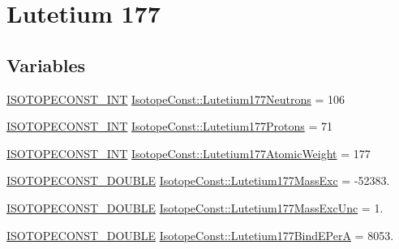 \hypertarget{group___isotope_const-_lutetium-_lu177}{}\section{Lutetium 177}
\label{group___isotope_const-_lutetium-_lu177}
\subsection*{Variables}
\begin{DoxyCompactItemize}
\item 
\mbox{\hyperlink{group___isotope_const-_macros_ga5f18360b3e99483a35c32d789e62621c}{I\+S\+O\+T\+O\+P\+E\+C\+O\+N\+S\+T\+\_\+\+I\+NT}} \mbox{\hyperlink{group___isotope_const-_lutetium-_lu177_gad6d464453c092cfb2d63554749f994ce}{Isotope\+Const\+::\+Lutetium177\+Neutrons}} = 106
\item 
\mbox{\hyperlink{group___isotope_const-_macros_ga5f18360b3e99483a35c32d789e62621c}{I\+S\+O\+T\+O\+P\+E\+C\+O\+N\+S\+T\+\_\+\+I\+NT}} \mbox{\hyperlink{group___isotope_const-_lutetium-_lu177_ga747c4b02fdf6a7a8f87b5d88b99d7524}{Isotope\+Const\+::\+Lutetium177\+Protons}} = 71
\item 
\mbox{\hyperlink{group___isotope_const-_macros_ga5f18360b3e99483a35c32d789e62621c}{I\+S\+O\+T\+O\+P\+E\+C\+O\+N\+S\+T\+\_\+\+I\+NT}} \mbox{\hyperlink{group___isotope_const-_lutetium-_lu177_ga48cc25429bcd0142e546bbd2a7e0170b}{Isotope\+Const\+::\+Lutetium177\+Atomic\+Weight}} = 177
\item 
\mbox{\hyperlink{group___isotope_const-_macros_ga8f45a7272ce02c0b4c65c44636ed719a}{I\+S\+O\+T\+O\+P\+E\+C\+O\+N\+S\+T\+\_\+\+D\+O\+U\+B\+LE}} \mbox{\hyperlink{group___isotope_const-_lutetium-_lu177_ga2f0b56c9773112af14bdf171770bb0f0}{Isotope\+Const\+::\+Lutetium177\+Mass\+Exc}} = -\/52383.
\item 
\mbox{\hyperlink{group___isotope_const-_macros_ga8f45a7272ce02c0b4c65c44636ed719a}{I\+S\+O\+T\+O\+P\+E\+C\+O\+N\+S\+T\+\_\+\+D\+O\+U\+B\+LE}} \mbox{\hyperlink{group___isotope_const-_lutetium-_lu177_ga18ececec13d5e8f736014676eb89f73c}{Isotope\+Const\+::\+Lutetium177\+Mass\+Exc\+Unc}} = 1.
\item 
\mbox{\hyperlink{group___isotope_const-_macros_ga8f45a7272ce02c0b4c65c44636ed719a}{I\+S\+O\+T\+O\+P\+E\+C\+O\+N\+S\+T\+\_\+\+D\+O\+U\+B\+LE}} \mbox{\hyperlink{group___isotope_const-_lutetium-_lu177_ga8eec48031f0aa691b84659774809b0f8}{Isotope\+Const\+::\+Lutetium177\+Bind\+E\+PerA}} = 8053.
\item 

\end{DoxyCompactItemize}
